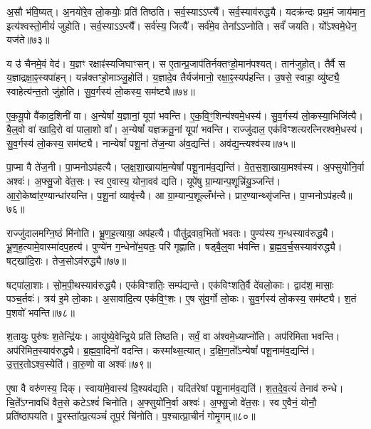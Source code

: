 अ॒सौ भ॑वि॒ष्यत्।
अ॒नयो॑रे॒व लो॒कयोः॒ प्रति॑ तिष्ठति।
सर्व॒स्याऽऽप्त्यै᳚।
सर्व॒स्याव॑रुद्ध्यै।
यदक्र॑न्दः प्रथ॒मं जाय॑मान॒ इत्य॑श्वस्तो॒मीयं॑ जुहोति।
सर्व॒स्याऽऽप्त्यै᳚।
सर्व॑स्य॒ जित्यै᳚।
सर्व॑मे॒व तेना᳚ऽऽप्नोति।
सर्वं॑ जयति।
यो᳚ऽश्वमे॒धेन॒ यज॑ते॥७३॥

य उ॑ चैनमे॒वं वेद॑।
य॒ज्ञꣳ रक्षाꣴ॑स्यजिघाꣳसन्।
स ए॒तान्प्र॒जाप॑तिर्नक्तꣳहो॒मान॑पश्यत्।
तान॑जुहोत्।
तैर्वै स य॒ज्ञाद्रक्षा॒ꣴ॒स्यपा॑हन्।
यन्न॑क्तꣳहो॒माञ्जु॒होति॑।
य॒ज्ञादे॒व तैर्यज॑मानो॒ रक्षा॒ꣴ॒स्यप॑हन्ति।
उ॒षसे॒ स्वाहा॒ व्यु॑ष्ट्यै॒ स्वाहेत्य॑न्त॒तो जु॑होति।
सु॒व॒र्गस्य॑ लो॒कस्य॒ सम॑ष्ट्यै॥७४॥\anuvakamend[वै नभाꣳ॑सि॒ सूर्यो॒ ज्योतिः॒ सन्त॑त्यै॒ सम॑ष्ट्यै भू॒तं यज॑ते॒ नव॑ च]

ए॒क॒यू॒पो वै॑काद॒शिनी॑ वा।
अ॒न्येषां᳚ य॒ज्ञानां॒ यूपा॑ भवन्ति।
ए॒क॒वि॒ꣳ॒शिन्य॑श्वमे॒धस्य॑।
सु॒व॒र्गस्य॑ लो॒कस्या॒भिजि॑त्यै।
बै॒ल्॒वो वा॑ खादि॒रो वा॑ पाला॒शो वा᳚।
अ॒न्येषां᳚ यज्ञक्रतू॒नां यूपा॑ भवन्ति।
राज्जु॑दाल॒ एक॑विꣳशत्यरत्निरश्वमे॒धस्य॑।
सु॒व॒र्गस्य॑ लो॒कस्य॒ सम॑ष्ट्यै।
नान्येषां᳚ पशू॒नां ते॑ज॒न्या अ॑व॒द्यन्ति॑।
अव॑द्य॒न्त्यश्व॑स्य॥७५॥

पा॒प्मा वै ते॑ज॒नी।
पा॒प्मनो\-ऽप॑हत्यै।
प्ल॒क्ष॒शा॒खाया॑म॒न्येषां᳚ पशू॒नाम॑व॒द्यन्ति॑।
वे॒त॒स॒शा॒खाया॒मश्व॑स्य।
अ॒फ्सुयो॑नि॒र्वा अश्वः॑।
अ॒फ्सु॒जो वे॑त॒सः।
स्व ए॒वास्य॒ योना॒वव॑ द्यति।
यूपे॑षु ग्रा॒म्यान्प॒शून्नि॑यु॒ञ्जन्ति॑।
आ॒रो॒केष्वा॑र॒ण्यान्धा॑रयन्ति।
प॒शू॒नां व्यावृ॑त्त्यै।
आ ग्रा॒म्यान्प॒शूल्लँभ॑न्ते।
प्रार॒ण्यान्थ्सृ॑जन्ति।
पा॒प्मनो\-ऽप॑हत्यै॥७६॥\anuvakamend[अश्व॑स्य॒ व्यावृ॑त्त्यै॒ त्रीणि॑ च]

राज्जु॑दालमग्नि॒ष्ठं मि॑नोति।
भ्रू॒ण॒ह॒त्याया॒ अप॑हत्यै।
पौतु॑द्रवाव॒भितो॑ भवतः।
पुण्य॑स्य ग॒न्धस्याव॑रुद्ध्यै।
भ्रू॒ण॒ह॒त्यामे॒वास्मा॑दप॒हत्य॑।
पुण्ये॑न ग॒न्धेनो॑भ॒यतः॒ परि॑ गृह्णाति।
षड्बै॒ल्॒वा भ॑वन्ति।
ब्र॒ह्म॒व॒र्च॒सस्याव॑रुद्ध्यै।
षट्खा॑दि॒राः।
तेज॒सो\-ऽव॑रुद्ध्यै॥७७॥

षट्पा॑ला॒शाः।
सो॒म॒पी॒थस्याव॑रुद्ध्यै।
एक॑विꣳशतिः॒ सम्प॑द्यन्ते।
एक॑विꣳशति॒र्वै दे॑वलो॒काः।
द्वाद॑श॒ मासाः॒ पञ्च॒र्तवः॑।
त्रय॑ इ॒मे लो॒काः।
अ॒सावा॑दि॒त्य एक॑वि॒ꣳ॒शः।
ए॒ष सु॑व॒र्गो लो॒कः।
सु॒व॒र्गस्य॑ लो॒कस्य॒ सम॑ष्ट्यै।
श॒तं प॒शवो॑ भवन्ति॥७८॥

श॒तायुः॒ पुरु॑षः श॒तेन्द्रि॑यः।
आयु॑ष्ये॒वेन्द्रि॒ये प्रति॑ तिष्ठति।
सर्वं॒ वा अ॑श्वमे॒ध्याप्नो॑ति।
अप॑रिमिता भवन्ति।
अप॑रिमित॒स्याव॑रुद्ध्यै।
ब्र॒ह्म॒वा॒दिनो॑ वदन्ति।
कस्मा᳚थ्स॒त्यात्।
द॒क्षि॒ण॒तो᳚\-ऽन्येषां᳚ पशू॒नाम॑व॒द्यन्ति॑।
उ॒त्त॒र॒तो\-ऽश्व॒स्येति॑।
वा॒रु॒णो वा अश्वः॑॥७९॥

ए॒षा वै वरु॑णस्य॒ दिक्।
स्वाया॑मे॒वास्य॑ दि॒श्यव॑द्यति।
यदित॑रेषां पशू॒नाम॑व॒द्यति॑।
श॒त॒दे॒व॒त्यं॑ तेनाव॑ रुन्धे।
चि॒ते᳚\-ऽग्नावधि॑ वैत॒से कटे\-ऽश्वं॑ चिनोति।
अ॒फ्सुयो॑नि॒र्वा अश्वः॑।
अ॒फ्सु॒जो वे॑त॒सः।
स्व ए॒वैनं॒ योनौ॒ प्रति॑\-ष्ठापयति।
पु॒रस्ता᳚त्प्र॒त्यञ्चं॑ तूप॒रं चि॑नोति।
प॒श्चात्प्रा॒चीनं॑ गोमृ॒गम्॥८०॥


